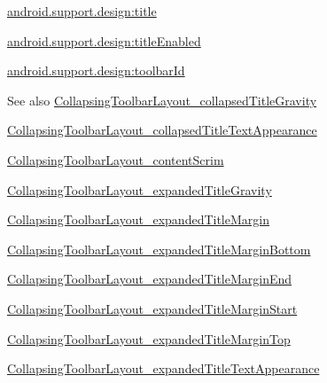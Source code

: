{\ttfamily \hyperlink{classandroid_1_1support_1_1design_1_1R_1_1styleable_aed337c7cc5f2d54034841fd6d7dfda1d}{android.\+support.\+design\+:title}}

{\ttfamily \hyperlink{classandroid_1_1support_1_1design_1_1R_1_1styleable_aee5150e8b214ad7200a094c9faf6bbee}{android.\+support.\+design\+:title\+Enabled}}

{\ttfamily \hyperlink{classandroid_1_1support_1_1design_1_1R_1_1styleable_af10a1e768d230d7c7f1117fe0ca3de0a}{android.\+support.\+design\+:toolbar\+Id}}

\begin{DoxySeeAlso}{See also}
\hyperlink{classandroid_1_1support_1_1design_1_1R_1_1styleable_a1873cdd61433f0299df88db2300d219e}{Collapsing\+Toolbar\+Layout\+\_\+collapsed\+Title\+Gravity} 

\hyperlink{classandroid_1_1support_1_1design_1_1R_1_1styleable_a86e1c80d3c72a9b5420d66a51d90a49f}{Collapsing\+Toolbar\+Layout\+\_\+collapsed\+Title\+Text\+Appearance} 

\hyperlink{classandroid_1_1support_1_1design_1_1R_1_1styleable_aaae4497bf3d18eafeeaff35e11812145}{Collapsing\+Toolbar\+Layout\+\_\+content\+Scrim} 

\hyperlink{classandroid_1_1support_1_1design_1_1R_1_1styleable_a512c33aaaf433f1d80a20c2664d93cc6}{Collapsing\+Toolbar\+Layout\+\_\+expanded\+Title\+Gravity} 

\hyperlink{classandroid_1_1support_1_1design_1_1R_1_1styleable_a7f6c3d7589ba466516400c94b09af6dd}{Collapsing\+Toolbar\+Layout\+\_\+expanded\+Title\+Margin} 

\hyperlink{classandroid_1_1support_1_1design_1_1R_1_1styleable_af49b937af4809fe755f0935bab497665}{Collapsing\+Toolbar\+Layout\+\_\+expanded\+Title\+Margin\+Bottom} 

\hyperlink{classandroid_1_1support_1_1design_1_1R_1_1styleable_a35cd54b33a367b2c848a150b8b4c8924}{Collapsing\+Toolbar\+Layout\+\_\+expanded\+Title\+Margin\+End} 

\hyperlink{classandroid_1_1support_1_1design_1_1R_1_1styleable_a0f562825d10f9717d8465bda7c24e1ad}{Collapsing\+Toolbar\+Layout\+\_\+expanded\+Title\+Margin\+Start} 

\hyperlink{classandroid_1_1support_1_1design_1_1R_1_1styleable_aa857ae82aafd5733306283d8cebed1b9}{Collapsing\+Toolbar\+Layout\+\_\+expanded\+Title\+Margin\+Top} 

\hyperlink{classandroid_1_1support_1_1design_1_1R_1_1styleable_ac93bbda7f962bc3fa75ce23c2ec87ab8}{Collapsing\+Toolbar\+Layout\+\_\+expanded\+Title\+Text\+Appearance} 


\end{DoxySeeAlso}
